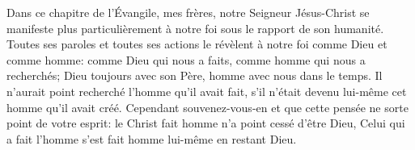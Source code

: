  Dans ce chapitre de l’Évangile, mes frères,
	notre Seigneur Jésus-Christ se manifeste plus particulièrement à notre foi
	sous le rapport de son humanité.
Toutes ses paroles et toutes ses actions le révèlent à notre foi
		comme Dieu et comme homme:
	comme Dieu qui nous a faits, comme homme qui nous a recherchés;
	Dieu toujours avec son Père, homme avec nous dans le temps.
Il n’aurait point recherché l’homme qu’il avait fait,
	s’il n’était devenu lui-même cet homme qu’il avait créé.
Cependant souvenez-vous-en et que cette pensée ne sorte point de votre esprit:
	le Christ fait homme n’a point cessé d’être Dieu,
	Celui qui a fait l’homme s’est fait homme lui-même en restant Dieu.
